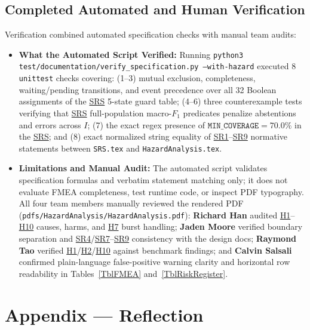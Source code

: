 \documentclass[11pt]{article}
\newcommand{\SRS}{\hyperlink{ha-acr-srs}{SRS}}
\begin{document}
\subsection{Completed Automated and Human Verification}
Verification combined automated specification checks with manual team audits:
\begin{itemize}[leftmargin=*, noitemsep]
    \item \textbf{What the Automated Script Verified:} Running \texttt{python3 test/\allowbreak{}documentation/\allowbreak{}verify\_\allowbreak{}specification.py \allowbreak{}--with-hazard} executed 8 \texttt{unittest} checks covering: (1--3) mutual exclusion, completeness, waiting/pending transitions, and event precedence over all 32 Boolean assignments of the \SRS{} 5-state guard table; (4--6) three counterexample tests verifying that \SRS{} full-population macro-$F_1$ predicates penalize abstentions and errors across $I$; (7) the exact regex presence of $\texttt{MIN\_COVERAGE} = 70.0\%$ in the \SRS{}; and (8) exact normalized string equality of \hyperref[SR1]{SR1}--\hyperref[SR9]{SR9} normative statements between \texttt{SRS.tex} and \texttt{HazardAnalysis.tex}.
    \item \textbf{Limitations and Manual Audit:} The automated script validates specification formulas and verbatim statement matching only; it does not evaluate FMEA completeness, test runtime code, or inspect PDF typography. All four team members manually reviewed the rendered PDF (\texttt{pdfs/\allowbreak{}HazardAnalysis/\allowbreak{}HazardAnalysis.pdf}): \textbf{Richard Han} audited \hyperref[haz:H1]{H1}--\hyperref[haz:H10]{H10} causes, harms, and \hyperref[haz:H7]{H7} burst handling; \textbf{Jaden Moore} verified boundary separation and \hyperref[SR4]{SR4}/\hyperref[SR7]{SR7}--\hyperref[SR9]{SR9} consistency with the design docs; \textbf{Raymond Tao} verified \hyperref[haz:H1]{H1}/\hyperref[haz:H2]{H2}/\hyperref[haz:H10]{H10} against benchmark findings; and \textbf{Calvin Salsali} confirmed plain-language false-positive warning clarity and horizontal row readability in Tables~\ref{TblFMEA} and~\ref{TblRiskRegister}.
\end{itemize}

\newpage

\section{Appendix --- Reflection}\label{sec:ha-reflection}
\end{document}
